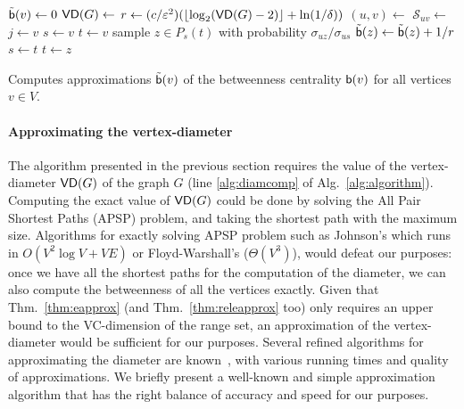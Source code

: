 \begin{algorithm}[h]
   \DontPrintSemicolon
  {
  $\tilde{\mathsf{b}}(v)\leftarrow 0$
  }
  $\mathsf{VD}(G)\leftarrow$\label{alg:diamcomp}\; 
  $r\leftarrow (c/\varepsilon^2)(\lfloor\log_2(\mathsf{VD}(G)-2)\rfloor+\ln(1/\delta))$\;
  {\label{algline:forloop}
  $(u,v)\leftarrow$\;
  $\mathcal{S}_{uv}\leftarrow$\label{algline:shortestpaths}\;
  {
  $j\leftarrow v$\;
  $s\leftarrow v$\;
  $t\leftarrow v$\;
   {
  sample $z\in P_s(t)$ with probability $\sigma_{uz}/\sigma_{us}$\;
   {
  $\tilde{\mathsf{b}}(z) \leftarrow \tilde{\mathsf{b}}(z)+1/r$\;
  $s\leftarrow t$\;
  $t\leftarrow z$\;
  }
  }
  }
  } %
  \caption{Computes approximations $\tilde{\mathsf{b}}(v)$ of the betweenness
  centrality $\mathsf{b}(v)$ for all vertices $v\in V$.}
  \label{alg:algorithm}
\end{algorithm}

\paragraph{Approximating the vertex-diameter}%
The algorithm presented in the previous section requires the value of the
vertex-diameter $\mathsf{VD}(G)$ of the graph $G$ (line
\ref{alg:diamcomp} of Alg.~\ref{alg:algorithm}). 
Computing the exact value of $\mathsf{VD}(G)$ could be done by solving the All Pair
Shortest Paths (APSP) problem, and taking the shortest path with the maximum size.
Algorithms for exactly solving APSP problem such as Johnson's which runs in
$O(V^2\log V+VE)$ or Floyd-Warshall's ($\Theta(V^3)$), would defeat our
purposes: once we have all the shortest paths for the computation of
the diameter, we can also compute the betweenness of all the vertices exactly. 
Given that Thm.~\ref{thm:eapprox} (and Thm.~\ref{thm:releapprox} too) only
requires an upper bound to the VC-dimension of the range set, an approximation
of the vertex-diameter would be sufficient for our purposes. Several refined
algorithms for approximating the diameter are
known~\citep{AingwordCIM99,BoitmanisFL06,RodittyW12}, with various running times
and quality of approximations. We briefly present a well-known and simple
approximation algorithm that has the right balance of accuracy and speed
for our purposes.

